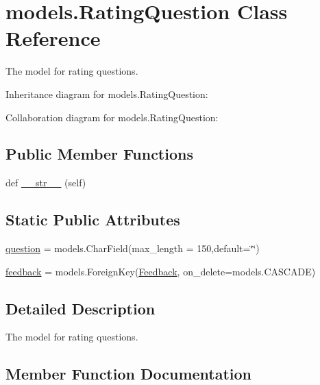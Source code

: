 \hypertarget{classmodels_1_1_rating_question}{}\section{models.\+Rating\+Question Class Reference}
\label{classmodels_1_1_rating_question}


The model for rating questions.  




Inheritance diagram for models.\+Rating\+Question\+:


Collaboration diagram for models.\+Rating\+Question\+:
\subsection*{Public Member Functions}
\begin{DoxyCompactItemize}
\item 
def \hyperlink{classmodels_1_1_rating_question_a27cd4581199718c351ad9bd909cdc1bc}{\+\_\+\+\_\+str\+\_\+\+\_\+} (self)
\end{DoxyCompactItemize}
\subsection*{Static Public Attributes}
\begin{DoxyCompactItemize}
\item 
\hyperlink{classmodels_1_1_rating_question_ad81ee9d9602fb918a73f79f465eac138}{question} = models.\+Char\+Field(max\+\_\+length = 150,default=\char`\"{}\char`\"{})
\item 
\hyperlink{classmodels_1_1_rating_question_aaf78772ef9f8d0efb7b29c8d6c3f1a4e}{feedback} = models.\+Foreign\+Key(\hyperlink{classmodels_1_1_feedback}{Feedback}, on\+\_\+delete=models.\+C\+A\+S\+C\+A\+DE)
\end{DoxyCompactItemize}


\subsection{Detailed Description}
The model for rating questions. 

\subsection{Member Function Documentation}

